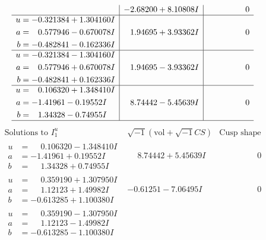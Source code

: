 \documentclass[1p]{elsarticle_modified}
\theoremstyle{definition}
\newcommand{\I}{\sqrt{-1}}
\begin{document}
$$\begin{array}{c|c|c}
 & -2.68200 + 8.10808 I & \phantom{-0.000000 } 0 \\ \hline\begin{aligned}
u &= -0.321384 + 1.304160 I \\
a &= \phantom{-}0.577946 - 0.670078 I \\
b &= -0.482841 - 0.162336 I\end{aligned}
 & \phantom{-}1.94695 + 3.93362 I & \phantom{-0.000000 } 0 \\ \hline\begin{aligned}
u &= -0.321384 - 1.304160 I \\
a &= \phantom{-}0.577946 + 0.670078 I \\
b &= -0.482841 + 0.162336 I\end{aligned}
 & \phantom{-}1.94695 - 3.93362 I & \phantom{-0.000000 } 0 \\ \hline\begin{aligned}
u &= \phantom{-}0.106320 + 1.348410 I \\
a &= -1.41961 - 0.19552 I \\
b &= \phantom{-}1.34328 - 0.74955 I\end{aligned}
 & \phantom{-}8.74442 - 5.45639 I & \phantom{-0.000000 } 0\\
 \hline 
 \end{array}$$\newpage$$\begin{array}{c|c|c}  
\text{Solutions to }I^u_{1}& \I (\text{vol} + \sqrt{-1}CS) & \text{Cusp shape}\\
 \hline 
\begin{aligned}
u &= \phantom{-}0.106320 - 1.348410 I \\
a &= -1.41961 + 0.19552 I \\
b &= \phantom{-}1.34328 + 0.74955 I\end{aligned}
 & \phantom{-}8.74442 + 5.45639 I & \phantom{-0.000000 } 0 \\ \hline\begin{aligned}
u &= \phantom{-}0.359190 + 1.307950 I \\
a &= \phantom{-}1.12123 + 1.49982 I \\
b &= -0.613285 + 1.100380 I\end{aligned}
 & -0.61251 - 7.06495 I & \phantom{-0.000000 } 0 \\ \hline\begin{aligned}
u &= \phantom{-}0.359190 - 1.307950 I \\
a &= \phantom{-}1.12123 - 1.49982 I \\
b &= -0.613285 - 1.100380 I\end{aligned}

\end{array}$$
\end{document}
